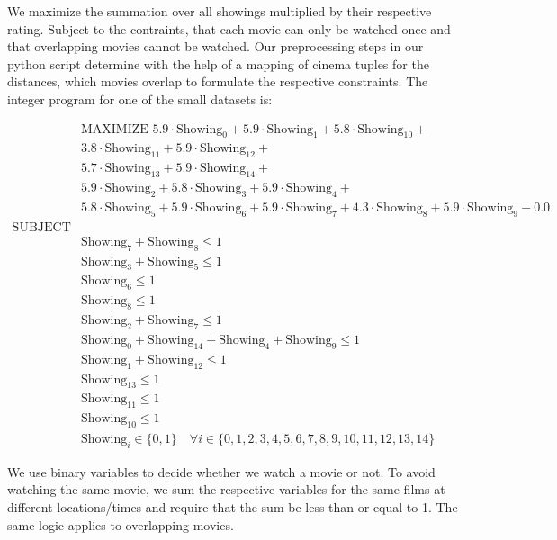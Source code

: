 \documentclass{article}
\begin{document}
We maximize the summation over all showings multiplied by their respective rating.
Subject to the contraints, that each movie can only be watched once and that overlapping movies cannot be watched.
Our preprocessing steps in our python script determine with the help of a mapping of cinema tuples for the distances, which movies overlap to formulate the respective constraints.
The integer program for one of the small datasets is:

\begin{align*}
    &\text{MAXIMIZE }
        5.9 \cdot \text{Showing}_0 + 5.9 \cdot \text{Showing}_1 + 5.8 \cdot \text{Showing}_{10} +\\
        &3.8 \cdot \text{Showing}_{11} + 5.9 \cdot \text{Showing}_{12} + \\
        & 5.7 \cdot \text{Showing}_{13} + 5.9 \cdot \text{Showing}_{14} + \\
        &5.9 \cdot \text{Showing}_2 + 5.8 \cdot \text{Showing}_3 + 5.9 \cdot \text{Showing}_4 + \\
        & 5.8 \cdot \text{Showing}_5 + 5.9 \cdot \text{Showing}_6 + 5.9 \cdot \text{Showing}_7 + 4.3 \cdot \text{Showing}_8 + 5.9 \cdot \text{Showing}_9 + 0.0\\
    \text{SUBJECT TO} & \\
    & \text{Showing}_7 + \text{Showing}_8 \leq 1 \\
    & \text{Showing}_3 + \text{Showing}_5 \leq 1 \\
    & \text{Showing}_6 \leq 1 \\
    & \text{Showing}_8 \leq 1 \\
    & \text{Showing}_2 + \text{Showing}_7 \leq 1 \\
    & \text{Showing}_0 + \text{Showing}_{14} + \text{Showing}_4 + \text{Showing}_9 \leq 1 \\
    &  \text{Showing}_1 + \text{Showing}_{12} \leq 1 \\
    & \text{Showing}_{13} \leq 1 \\
    &  \text{Showing}_{11} \leq 1 \\
    &  \text{Showing}_{10} \leq 1 \\
    & \text{Showing}_i \in \{0,1\} \quad \forall i \in \{0,1,2,3,4,5,6,7,8,9,10,11,12,13,14\}
\end{align*}


We use binary variables to decide whether we watch a movie or not. To avoid watching the same movie, we sum the respective variables for the same films at different locations/times and require that the sum be less than or equal to 1. The same logic applies to overlapping movies.
\end{document}

